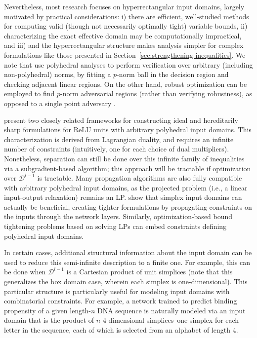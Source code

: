 Nevertheless, most research focuses on hyperrectangular input domains, largely motivated by practical considerations: i) there are efficient, well-studied methods for computing valid (though not necessarily optimally tight) variable bounds, ii) characterizing the exact effective domain may be computationally impractical, and iii) and the hyperrectangular structure makes analysis simpler for complex formulations like those presented in Section~\ref{sec:strengthening-inequalities}. 
We note that \cite{jordan2019neurips} use polyhedral analyses to perform verification over arbitrary (including non-polyhedral) norms, by fitting a $p$-norm ball in the decision region and checking adjacent linear regions. 
On the other hand, robust optimization can be employed to find $p$-norm adversarial regions (rather than verifying robustness), as opposed to a single point adversary \citep{maragno2023finding}. 

\cite{anderson2020strong} present two closely related frameworks for constructing ideal and hereditarily sharp formulations for ReLU units with arbitrary polyhedral input domains. This characterization is derived from Lagrangian duality, and requires an infinite number of constraints (intuitively, one for each choice of dual multipliers). Nonetheless, separation can still be done over this infinite family of inequalities via a subgradient-based algorithm; this approach will be tractable if optimization over $\mathcal{D}^{l-1}$ is tractable. 
Many propagation algorithms are also fully compatible with arbitrary polyhedral input domains, as the projected problem (i.e., a linear input-output relaxation) remains an LP. 
\cite{singh2021overcoming} show that simplex input domains can actually be beneficial, creating tighter formulations by propagating constraints on the inputs through the network layers.
Similarly, optimization-based bound tightening problems based on solving LPs can embed constraints defining polyhedral input domains. 


In certain cases, additional structural information about the input domain can be used to reduce this semi-infinite description to a finite one. For example, this can be done when $\mathcal{D}^{l-1}$ is a Cartesian product of unit simplices \citep{anderson2020strong} (note that this generalizes the box domain case, wherein each simplex is one-dimensional). This particular structure is particularly useful for modeling input domains with combinatorial constraints. For example, a network trained to predict binding propensity of a given length-$n$ DNA sequence is naturally modeled via an input domain that is the product of $n$ 4-dimensional simplices--one simplex for each letter in the sequence, each of which is selected from an alphabet of length 4.

